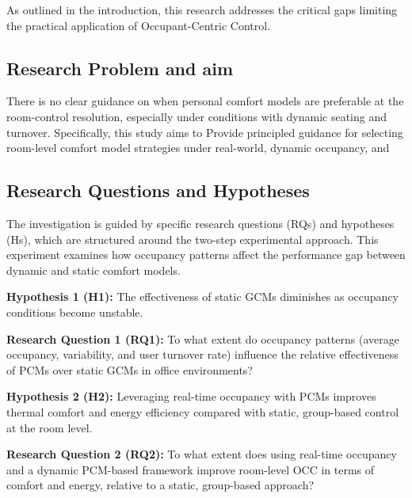 \label{sec:researchaim}
As outlined in the introduction, this research addresses the critical gaps limiting the practical application of Occupant-Centric Control.

\subsection{Research Problem and aim}
There is no clear guidance on when personal comfort models are preferable at the room-control resolution, especially under conditions with dynamic seating and turnover.  
Specifically, this study aims to Provide principled guidance for selecting room-level comfort model strategies under real-world, dynamic occupancy, and

\subsection{Research Questions and Hypotheses}
The investigation is guided by specific research questions (RQs) and hypotheses (Hs), which are structured around the two-step experimental approach.
This experiment examines how occupancy patterns affect the performance gap between dynamic and static comfort models.

\textbf{Hypothesis 1 (H1):}  
The effectiveness of static GCMs diminishes as occupancy conditions become unstable.

\textbf{Research Question 1 (RQ1):}  
To what extent do occupancy patterns (average occupancy, variability, and user turnover rate) influence the relative effectiveness of PCMs over static GCMs in office environments?

\textbf{Hypothesis 2 (H2):}  
Leveraging real-time occupancy with PCMs improves thermal comfort and energy efficiency compared with static, group-based control at the room level.

\textbf{Research Question 2 (RQ2):}  
To what extent does using real-time occupancy and a dynamic PCM-based framework improve room-level OCC in terms of comfort and energy, relative to a static, group-based approach?
